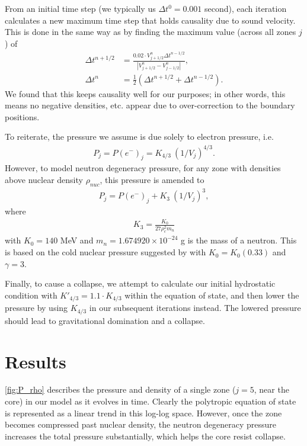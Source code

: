 \documentclass[12pt]{article}
\begin{document}
From an initial time step (we typically us $\Delta t^0 = 0.001$ second), each
iteration calculates a new maximum time step that holds causality due to sound
velocity. This is done in the same way as \citet{colgatewhite64} by finding the
maximum value (across all zones $j$) of
$$
\begin{aligned}
\Delta t^{n + 1/2}
&= \frac{0.02 \cdot V^n_{j + 1/2} \Delta t^{n - 1/2}}
        {|V^n_{j + 1/2} - V^n_{j - 1/2}|}, \\
\Delta t^n
&= \frac{1}{2} (\Delta t^{n + 1/2} + \Delta t^{n - 1/2}).
\end{aligned}
$$
We found that this keeps causality well for our purposes; in other words, this
means no negative densities, etc. appear due to over-correction to the
boundary positions.

To reiterate, the pressure we assume is due solely to electron pressure, i.e.
$$
\begin{aligned}
P_j = P(e^-)_j = K_{4/3}\ (1 / V_j)^{4/3}.
\end{aligned}
$$
However, to model neutron degeneracy pressure, for any zone with densities
above nuclear density $\rho_{nuc}$, this pressure is amended to
$$
\begin{aligned}
P_j = P(e^-)_j + K_3\ (1 / V_j)^3,
\end{aligned}
$$
where
$$
\begin{aligned}
K_3 = \frac{K_0}{27 \rho_c^2 m_n}
\end{aligned}
$$
with $K_0 = 140$ MeV and $m_n = 1.674920 \times 10^{-24}$ g is the mass of a
neutron. This is based on the cold nuclear pressure suggested by \citet{bck85} with
$K_0 = K_0(0.33)$ and $\gamma = 3$.

Finally, to cause a collapse, we attempt to calculate our initial hydrostatic condition
with $K'_{4/3} = 1.1 \cdot K_{4/3}$ within the equation of state, and then
lower the pressure by using $K_{4/3}$ in our subsequent iterations instead. The
lowered pressure should lead to gravitational domination and a collapse.


\section{Results}


\autoref{fig:P_rho} describes the pressure and density of a single zone ($j=5$, near the core)
in our model as it evolves in time. Clearly the polytropic equation of state is represented as a linear
trend in this log-log space. However, once the zone becomes compressed past nuclear density,
the neutron degeneracy pressure increases the total pressure substantially, which helps the
core resist collapse.
\end{document}
